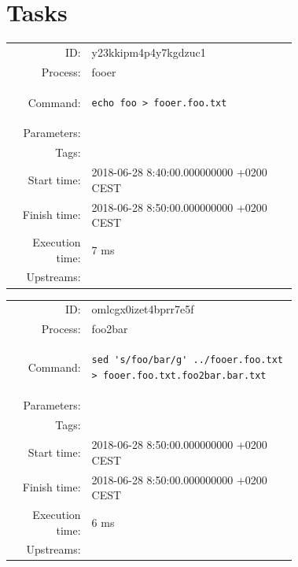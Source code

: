 \documentclass[11pt,oneside,openright]{memoir}
\begin{document}
%
\section*{Tasks}

    \begin{tcolorbox}[ title=fooer, 
                       colbacktitle=color1, 
                       colback=color1!50!white,
                       coltitle=black ]
        \small
        \begin{tabular}{rp{0.72\linewidth}}
ID: & y23kkipm4p4y7kgdzuc1 \\
Process: & fooer \\
Command: & \begin{lstlisting}
echo foo > fooer.foo.txt
\end{lstlisting} \\
Parameters:& \\
Tags: & \\
Start time:  & 2018-06-28 8:40:00.000000000 +0200 CEST \\
Finish time: & 2018-06-28 8:50:00.000000000 +0200 CEST \\
Execution time: & 7 ms \\
Upstreams: & \\
        \end{tabular}
    \end{tcolorbox}

    \begin{tcolorbox}[ title=foo2bar, 
                       colbacktitle=color2, 
                       colback=color2!50!white, 
                       coltitle=black ]
        \small
        \begin{tabular}{rp{0.72\linewidth}}
ID: & omlcgx0izet4bprr7e5f \\
Process: & foo2bar \\
Command: & \begin{lstlisting}
sed 's/foo/bar/g' ../fooer.foo.txt > fooer.foo.txt.foo2bar.bar.txt
\end{lstlisting} \\
Parameters:& \\
Tags: & \\
Start time: & 2018-06-28 8:50:00.000000000 +0200 CEST \\
Finish time: & 2018-06-28 8:50:00.000000000 +0200 CEST \\
Execution time: & 6 ms \\
Upstreams: & \\
        \end{tabular}
    \end{tcolorbox}
\end{document}
